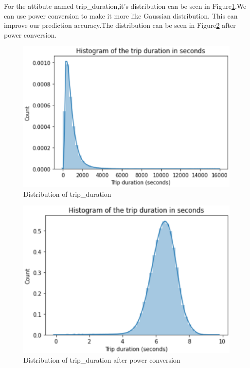 \par For the attibute named trip\_duration,it's distribution can be seen in Figure\ref{17}.We can use power conversion to make it more like Gaussian distribution.
This can improve our prediction accuracy.The distribution can be seen in Figure\ref{18} after power conversion.
\begin{figure}[htbp]
	\centering
	\includegraphics[scale=0.4]{figures/17.eps}
	\caption{Distribution of trip\_duration } \label{17}
\end{figure}

\begin{figure}[htbp]
	\centering
	\includegraphics[scale=0.4]{figures/18.eps}
	\caption{Distribution of trip\_duration after power conversion } \label{18}
\end{figure}

